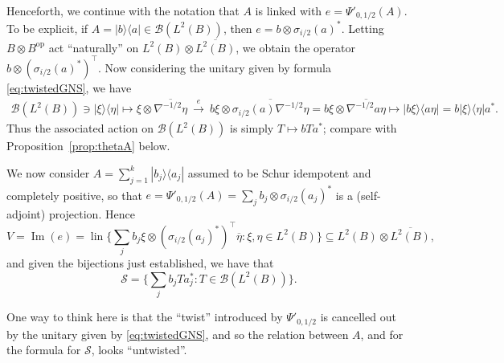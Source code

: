 \documentclass[a4paper,11pt]{article}
\theoremstyle{plain}
\theoremstyle{remark}
\newenvironment{remark}
  {\pushQED{\qed}\renewcommand{\qedsymbol}{$\triangle$}\remarkx}
  {\popQED\endremarkx}
\newcommand{\mc}[1]{\mathcal{#1}}
\newcommand{\lin}{\operatorname{lin}}
\newcommand{\op}{{\operatorname{op}}}
\newcommand{\im}{{\operatorname{Im}}}
\begin{document}
Henceforth, we continue with the notation that $A$ is linked with $e = \Psi'_{0,1/2}(A)$.  To be explicit, if $A = |b\rangle \langle a| \in\mc B(L^2(B))$, then $e = b \otimes \sigma_{i/2}(a)^*$.  Letting $B\otimes B^\op$ act ``naturally'' on $L^2(B) \otimes \overline{L^2(B)}$, we obtain the operator $b \otimes (\sigma_{i/2}(a)^*)^\top$.  Now considering the unitary given by formula \eqref{eq:twistedGNS}, we have
\begin{align*}
\mc B(L^2(B)) \ni  |\xi\rangle \langle\eta| \mapsto \xi \otimes \overline{\nabla^{-1/2}\eta}
\ \xrightarrow{e} \ 
b\xi \otimes \overline{\sigma_{i/2}(a) \nabla^{-1/2} \eta}
= b\xi \otimes \overline{\nabla^{-1/2} a \eta}
\mapsto |b\xi\rangle \langle a\eta|
= b |\xi\rangle \langle\eta| a^*.
\end{align*}
Thus the associated action on $\mc B(L^2(B))$ is simply $T\mapsto bTa^*$; compare with Proposition~\ref{prop:thetaA} below.

We now consider $A = \sum_{j=1}^k | b_j \rangle \langle a_j |$ assumed to be Schur idempotent and completely positive, so that $e = \Psi'_{0,1/2}(A) = \sum_j b_j \otimes \sigma_{i/2}(a_j)^*$ is a (self-adjoint) projection.  Hence
\[ V = \im (e) = \lin \Big\{ \sum_j b_j\xi \otimes (\sigma_{i/2}(a_j)^*)^\top\overline\eta : \xi,\eta\in L^2(B) \Big\} \subseteq L^2(B) \otimes \overline{L^2(B)}, \]
and given the bijections just established, we have that
\begin{equation}
\mc S = \Big\{ \sum_j b_j T a_j^* : T\in\mc B(L^2(B)) \Big\}.
\label{eq:S_from_A}
\end{equation}

\begin{remark}
One way to think here is that the ``twist'' introduced by $\Psi'_{0,1/2}$ is cancelled out by the unitary given by \eqref{eq:twistedGNS}, and so the relation between $A$, and for the formula for $\mc S$, looks ``untwisted''.
\end{remark}
\end{document}
